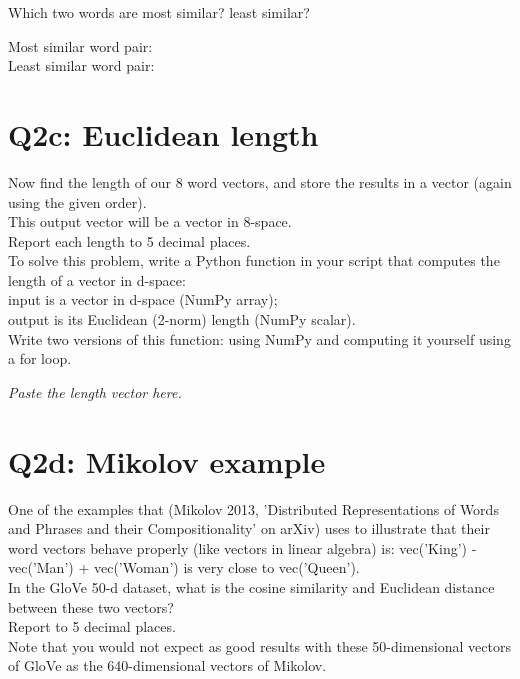 \documentclass[10pt]{article}
\renewcommand{\(}{\left(}
\renewcommand{\)}{\right)}
\theoremstyle{plain}
\theoremstyle{plain}
\theoremstyle{definition}
\begin{document}
      Which two words are most similar? least similar?
      \begin{shaded}
      Most similar word pair:  \\
      Least similar word pair: 
      \end{shaded}

\clearpage

\section*{Q2c: Euclidean length}

      Now find the length of our 8 word vectors,
      and store the results in a vector (again using the given order).\\
      This output vector will be a vector in 8-space.\\
      Report each length to 5 decimal places.\\

      To solve this problem,
      write a Python function in your script
      that computes the length of a vector in d-space:\\
      input is a vector in d-space (NumPy array); \\
      output is its Euclidean (2-norm) length (NumPy scalar).\\
      Write two versions of this function: 
      using NumPy and computing it yourself using a for loop.

      \begin{shaded}
      {\em Paste the length vector here.}
      \end{shaded}

\section*{Q2d: Mikolov example}

      One of the examples that (Mikolov 2013, 
      'Distributed Representations of Words and Phrases and their Compositionality' on arXiv)
      uses to illustrate that their word vectors behave properly
      (like vectors in linear algebra) is:
      vec('King') - vec('Man') + vec('Woman') is very close to vec('Queen').\\

      In the GloVe 50-d dataset,
      what is the cosine similarity and Euclidean distance
      between these two vectors?\\
      Report to 5 decimal places.\\
      Note that you would not expect as good results 
      with these 50-dimensional vectors of GloVe
      as the 640-dimensional vectors of Mikolov.
\end{document}
